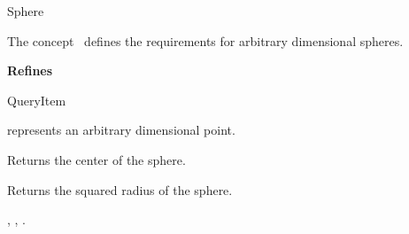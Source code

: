 

\begin{ccRefConcept}{Sphere}


\ccDefinition
  
The concept \ccRefName\ defines the requirements for arbitrary dimensional spheres.

{\bf Refines}

QueryItem

\ccParameters

 represents an arbitrary dimensional point.

\ccTypes






\ccOperations

{Returns the center of the sphere.}


{Returns the squared radius of the sphere.}


\ccHasModels

, , 
.



\end{ccRefConcept}


